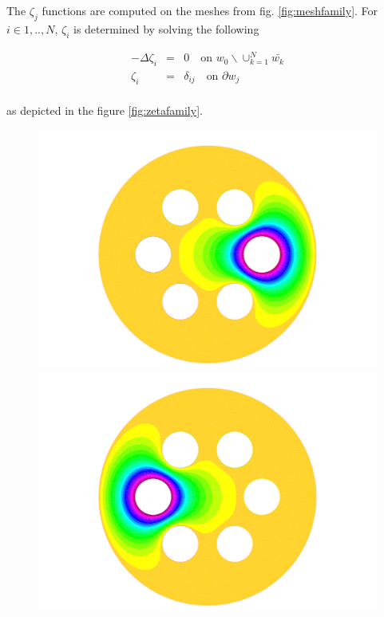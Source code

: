 The $\zeta_j$ functions are computed on the meshes from fig. \ref{fig:meshfamily}. For $i \in {1,..,N}$, $\zeta_i$ is determined by solving the following 

\begin{equation}
  \label{eq:zetapde}
  \begin{array}{rcl}
    -\Delta \zeta_i &=& 0 \quad \text{on }  w_0 \backslash \cup_{k=1}^N \bar{w_k}\\
    \zeta_i &=& \delta_{ij} \quad \text{on } \partial w_j \\ 
  \end{array}  
\end{equation}

as depicted in the figure \ref{fig:zetafamily}.

\begin{figure}[!h]
  \centering
  \includegraphics[scale=0.20]{fig/sol_0.pdf}
  \includegraphics[scale=0.20]{fig/sol_3.pdf}

\end{figure}
